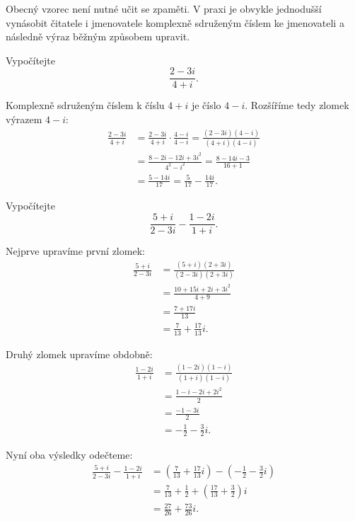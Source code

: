 \documentclass[12pt,a4paper]{article}
\begin{document}
Obecný vzorec není nutné učit se zpaměti. 
V praxi je obvykle jednodušší vynásobit čitatele i jmenovatele komplexně sdruženým číslem 
ke jmenovateli a následně výraz běžným způsobem upravit.

\begin{examplebox}
    Vypočítejte
    \[
        \frac{2-3i}{4+i}.
    \]

    Komplexně sdruženým číslem k číslu $4+i$ je číslo $4-i$. 
    Rozšíříme tedy zlomek výrazem $4-i$:
    \begin{align*}
        \frac{2-3i}{4+i}    &= \frac{2-3i}{4+i}\cdot\frac{4-i}{4-i}
                             = \frac{(2-3i)(4-i)}{(4+i)(4-i)}\\
                            &= \frac{8-2i-12i+3i^2}{4^2-i^2}
                             = \frac{8-14i-3}{16+1}\\
                            &= \frac{5-14i}{17}
                             = \frac{5}{17}-\frac{14i}{17}.
    \end{align*}
\end{examplebox}

\begin{examplebox}
    Vypočítejte
    \[
        \frac{5+i}{2-3i}-\frac{1-2i}{1+i}.
    \]

    Nejprve upravíme první zlomek:
    \begin{align*}
        \frac{5+i}{2-3i}    &= \frac{(5+i)(2+3i)}{(2-3i)(2+3i)}\\
                            &= \frac{10+15i+2i+3i^2}{4+9}\\
                            &= \frac{7+17i}{13}\\
                            &= \frac{7}{13}+\frac{17}{13}i.
    \end{align*}

    Druhý zlomek upravíme obdobně:
    \begin{align*}
        \frac{1-2i}{1+i}    &= \frac{(1-2i)(1-i)}{(1+i)(1-i)}\\
                            &= \frac{1-i-2i+2i^2}{2}\\
                            &= \frac{-1-3i}{2}\\
                            &= -\frac{1}{2}-\frac{3}{2}i.
    \end{align*}

    Nyní oba výsledky odečteme:
    \begin{align*}
        \frac{5+i}{2-3i}-\frac{1-2i}{1+i}   &=  \left(\frac{7}{13}+\frac{17}{13}i\right)
                                                -
                                                \left(-\frac{1}{2}-\frac{3}{2}i\right)\\
                                            &= \frac{7}{13}+\frac{1}{2}+\left(\frac{17}{13}+\frac{3}{2}\right)i\\
                                            &= \frac{27}{26}+\frac{73}{26}i.
    \end{align*}
\end{examplebox}
\end{document}
